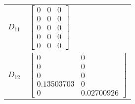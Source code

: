 \begin{tabular}{cl}
 $D_{11}$ & $\left[\begin{matrix}0 & 0 & 0\\0 & 0 & 0\\0 & 0 & 0\\0 & 0 & 0\\0 & 0 & 0\end{matrix}\right]$                                                                                                                                                                                                                                                                                                                                                                                                                                                                                                                                                                                                                                                                                                                                                                                                                                                                                                                                                                                                                                       \\
 $D_{12}$ & $\left[\begin{matrix}0 & 0\\0 & 0\\0 & 0\\0.13503703 & 0\\0 & 0.02700926\end{matrix}\right]$                                                                                                                                                                                                                                                                                                                                                                                                                                                                                                                                                                                                                                                                                                                                                                                                                                                                                                                                                                                                                                         \\

\end{tabular}
